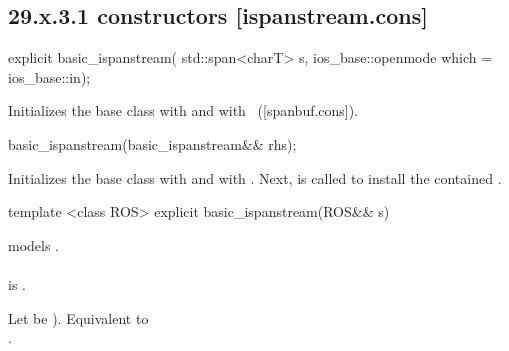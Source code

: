 \documentclass[ebook,11pt,article]{memoir}
\renewcommand{\iref}[1]{[#1]}
\begin{document}

\subsection{29.x.3.1  constructors [ispanstream.cons]}
\label{ispanstream.cons}

\begin{itemdecl}
explicit basic_ispanstream(
  std::span<charT> s,
  ios_base::openmode which = ios_base::in);
\end{itemdecl}

\begin{itemdescr}
\pnum
\effects
Initializes the base class with
and  with
~(\iref{spanbuf.cons}).
\end{itemdescr}

\begin{itemdecl}
basic_ispanstream(basic_ispanstream&& rhs);
\end{itemdecl}

\begin{itemdescr}
\pnum
\effects 
Initializes the base class with  
and  with .
Next,  is called to
install the contained .
\end{itemdescr}


\begin{itemdecl}
template <class ROS>
explicit basic_ispanstream(ROS&& s)
\end{itemdecl}

\begin{itemdescr}
\pnum
\constraints
{} models .\\
\\  is .

\pnum
\effects
Let  be ). 
Equivalent to \\
.
\end{itemdescr}
\end{document}

